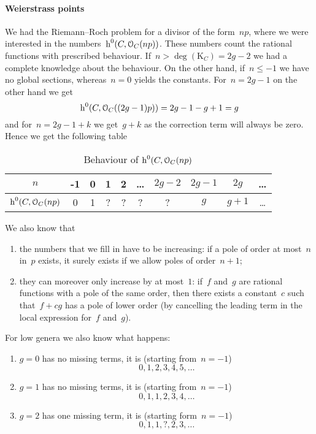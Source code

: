 \documentclass[10pt,a4paper]{article}
\begin{document}
\paragraph{Weierstrass points}
We had the Riemann--Roch problem for a divisor of the form~$np$, where we were interested in the numbers~$\operatorname{h}^0(C,\mathcal{O}_C(np))$. These numbers count the rational functions with prescribed behaviour. If~$n>\deg(\mathrm{K}_C)=2g-2$ we had a complete knowledge about the behaviour. On the other hand, if~$n\leq -1$ we have no global sections, whereas~$n=0$ yields the constants. For~$n=2g-1$ on the other hand we get
\begin{equation}
  \operatorname{h}^0(C,\mathcal{O}_C((2g-1)p))=2g-1-g+1=g
\end{equation}
and for~$n=2g-1+k$ we get~$g+k$ as the correction term will always be zero. Hence we get the following table
\begin{table}
  \centering
  \begin{tabular}{cccccccccc}
    $n$ & -1 & 0 & 1 & 2 & \dots & $2g-2$ & $2g-1$ & $2g$ & \dots \\\midrule
    $\operatorname{h}^0(C,\mathcal{O}_C(np)$ & 0 & 1 & ? & ? & ? & ? & $g$ & $g+1$ & \dots
  \end{tabular}
  \caption{Behaviour of $\operatorname{h}^0(C,\mathcal{O}_C(np)$}
  \label{table:np}
\end{table}
We also know that
\begin{enumerate}
  \item the numbers that we fill in have to be increasing: if a pole of order at most~$n$ in~$p$ exists, it surely exists if we allow poles of order~$n+1$;
  \item they can moreover only increase by at most~$1$: if~$f$ and~$g$ are rational functions with a pole of the same order, then there exists a constant~$c$ such that~$f+cg$ has a pole of lower order (by cancelling the leading term in the local expression for~$f$ and~$g$).
\end{enumerate}
For low genera we also know what happens:
\begin{enumerate}
  \item $g=0$ has no missing terms, it is (starting from~$n=-1$)
    \begin{equation}
      0, 1, 2, 3, 4, 5, \dotsc
    \end{equation}
  \item $g=1$ has no missing terms, it is (starting from~$n=-1$) 
    \begin{equation}
      0, 1, 1, 2, 3, 4, \dotsc
    \end{equation}
  \item $g=2$ has one missing term, it is (starting form~$n=-1$)
    \begin{equation}
      0, 1, 1, ? , 2, 3, \dotsc
    \end{equation}
\end{enumerate}
\end{document}
